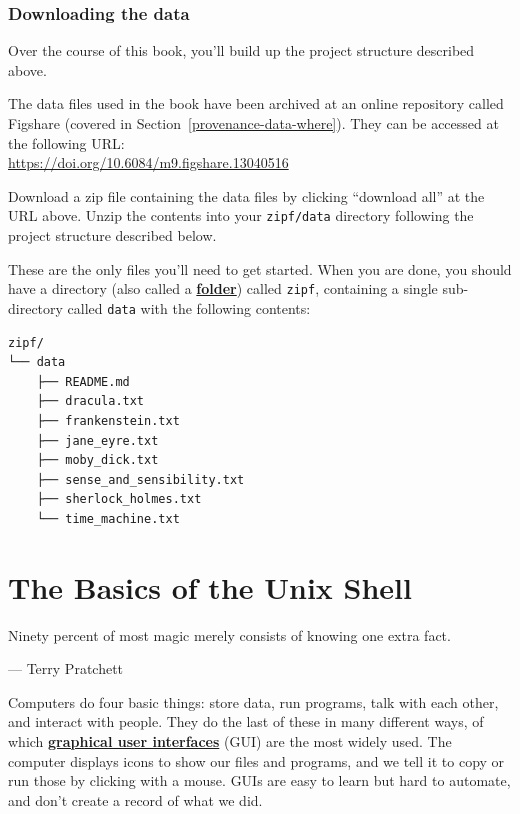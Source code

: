 \documentclass[
]{krantz}
\renewenvironment{quote}{\begin{VF}}{\end{VF}}
\newcommand{\gref}[2]{\hyperlink{#2}{\textbf{#1}}}
\begin{document}
\hypertarget{download-data}{%
\subsection{Downloading the data}\label{download-data}}

Over the course of this book,
you'll build up the project structure described above.

The data files used in the book have been archived
at an online repository called Figshare (covered in Section~\ref{provenance-data-where}).
They can be accessed at the following URL:\\
\url{https://doi.org/10.6084/m9.figshare.13040516}

Download a zip file containing the data files by clicking ``download all'' at the URL above.
Unzip the contents into your \texttt{zipf/data} directory
following the project structure described below.

These are the only files you'll need to get started.
When you are done,
you should have a directory (also called a \gref{folder}{folder})
called \texttt{zipf},
containing a single sub-directory called \texttt{data}
with the following contents:

\begin{verbatim}
zipf/
└── data
    ├── README.md
    ├── dracula.txt
    ├── frankenstein.txt
    ├── jane_eyre.txt
    ├── moby_dick.txt
    ├── sense_and_sensibility.txt
    ├── sherlock_holmes.txt
    └── time_machine.txt
\end{verbatim}

\hypertarget{bash-basics}{%
\chapter{The Basics of the Unix Shell}\label{bash-basics}}

\begin{quote}
Ninety percent of most magic merely consists of knowing one extra fact.

--- Terry Pratchett
\end{quote}

Computers do four basic things:
store data,
run programs,
talk with each other,
and interact with people.
They do the last of these in many different ways,
of which \gref{graphical user interfaces}{gui} (GUI) are the most widely used.
The computer displays icons to show our files and programs,
and we tell it to copy or run those by clicking with a mouse.
GUIs are easy to learn but hard to automate,
and don't create a record of what we did.
\end{document}
